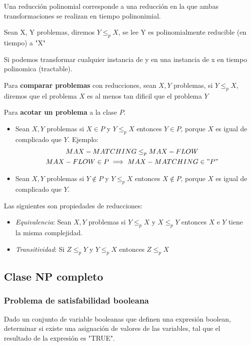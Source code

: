 \documentclass{article}
\begin{document}
Una reducción polinomial corresponde a una reducción en la que ambas transformaciones se realizan en tiempo polinonimial.

Sean X, Y problemas, diremos \(Y \leq_p X\), se lee Y es polinomialmente reducible (en tiempo) a "X"

Si podemos transformar cualquier instancia de y en una instancia de x en tiempo polinomica (tractable).

Para \textbf{comparar problemas} con reducciones, sean \(X, Y\) problemas, si \(Y \leq_p X\), diremos que 
el problema \(X\) es al menos tan dificil que el problema \(Y\)

Para \textbf{acotar un problema} a la clase \(P\). 
\begin{itemize}
    \item Sean \(X,Y\) problemas si \(X \in P\) y \(Y \leq_p X\) 
    entonces \(Y \in P\), porque \(X\) es igual de complicado que \(Y\). Ejemplo:
    \begin{gather*}
        MAX-MATCHING \leq_p MAX-FLOW \\
        MAX-FLOW \in P \implies MAX-MATCHING \in "P"    
    \end{gather*}
    
    \item Sean \(X,Y\) problemas si \(Y \notin P\) y \(Y \leq_p X\) 
    entonces \(X \notin P\), porque \(X\) es igual de complicado que \(Y\).
    
\end{itemize}

Las siguientes son propiedades de reducciones:

\begin{itemize}
    \item \textit{Equivalencia}: Sean \(X,Y\) problemas si \(Y \leq_p X\) y \(X \leq_p Y\) 
    entonces \(X\) e \(Y\) tiene la misma complejidad.
    \item \textit{Transitividad}: Si \(Z \leq_p Y\) y \(Y \leq_p X\) 
    entonces \(Z \leq_p X\)
\end{itemize}


\subsection{Clase NP completo}

\subsubsection{Problema de satisfabilidad booleana}
Dado un conjunto de variable booleanas que definen una expresión boolean, determinar si existe una
asignación de valores de las variables, tal que el resultado de la expresión es "TRUE".
\end{document}
